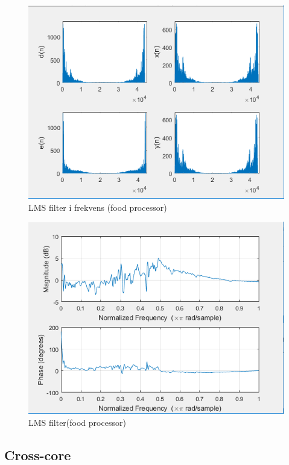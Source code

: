\begin{figure}[H]
	\centering
	\includegraphics[width = 400pt]{Img/Filter_Freq_food}
	\caption{LMS filter i frekvens (food processor)}
	\label{fig:Filter_Freq_food}
\end{figure}
\newpage

\begin{figure}[H]
	\centering
	\includegraphics[width = 400pt]{Img/Filter_food}
	\caption{LMS filter(food processor)}
	\label{fig:Filter_food}
\end{figure}

\subsection{Cross-core}
